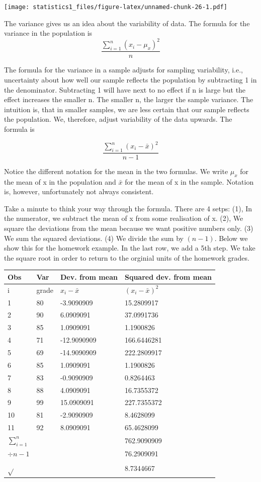 \documentclass[]{book}
\theoremstyle{definition}
\theoremstyle{definition}
\theoremstyle{definition}
\theoremstyle{remark}
\begin{document}
\texttt{[image: statistics1\_files/figure-latex/unnamed-chunk-26-1.pdf]}

The variance gives us an idea about the variability of data. The formula
for the variance in the population is
\[ \frac{\sum_{i=1}^n(x_i - \mu_x)^2}{n}\]

The formula for the variance in a sample adjusts for sampling
variability, i.e., uncertainty about how well our sample reflects the
population by subtracting 1 in the denominator. Subtracting 1 will have
next to no effect if n is large but the effect increases the smaller n.
The smaller n, the larger the sample variance. The intuition is, that in
smaller samples, we are less certain that our sample reflects the
population. We, therefore, adjust variability of the data upwards. The
formula is

\[ \frac{\sum_{i=1}^n(x_i - \bar{x})^2}{n-1}\]

Notice the different notation for the mean in the two formulas. We write
\(\mu_x\) for the mean of x in the population and \(\bar{x}\) for the
mean of x in the sample. Notation is, however, unfortunately not always
consistent.

Take a minute to think your way through the formula. There are 4 setps:
(1), In the numerator, we subtract the mean of x from some realisation
of x. (2), We square the deviations from the mean because we want
positive numbers only. (3) We sum the squared deviations. (4) We divide
the sum by \((n-1)\). Below we show this for the homework example. In
the last row, we add a 5th step. We take the square root in order to
return to the orginial units of the homework grades.

\begin{longtable}[]{@{}llll@{}}
\toprule
Obs & Var & Dev. from mean & Squared dev. from mean\tabularnewline
\midrule
\endhead
i & grade & \(x_i-\bar{x}\) & \((x_i-\bar{x})^2\)\tabularnewline
1 & 80 & -3.9090909 & 15.2809917\tabularnewline
2 & 90 & 6.0909091 & 37.0991736\tabularnewline
3 & 85 & 1.0909091 & 1.1900826\tabularnewline
4 & 71 & -12.9090909 & 166.6446281\tabularnewline
5 & 69 & -14.9090909 & 222.2809917\tabularnewline
6 & 85 & 1.0909091 & 1.1900826\tabularnewline
7 & 83 & -0.9090909 & 0.8264463\tabularnewline
8 & 88 & 4.0909091 & 16.7355372\tabularnewline
9 & 99 & 15.0909091 & 227.7355372\tabularnewline
10 & 81 & -2.9090909 & 8.4628099\tabularnewline
11 & 92 & 8.0909091 & 65.4628099\tabularnewline
\(\sum_{i=1}^n\) & & & 762.9090909\tabularnewline
\(\div n-1\) & & & 76.2909091\tabularnewline
\(\sqrt{}\) & & & 8.7344667\tabularnewline
\bottomrule
\end{longtable}
\end{document}

